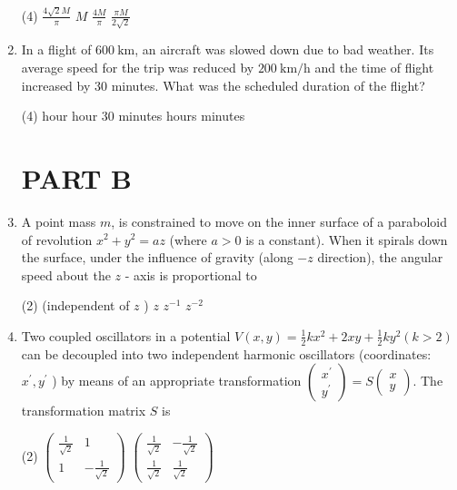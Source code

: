 \begin{enumerate}
 \begin{tasks}(4)
	\task[\textbf{a.}]$\frac{4 \sqrt{2} M}{\pi}$
	\task[\textbf{b.}]$M$
	\task[\textbf{c.}] $\frac{4 M}{\pi}$
	\task[\textbf{d.}] $\frac{\pi M}{2 \sqrt{2}}$
\end{tasks}
\item  In a flight of $600 \mathrm{~km}$, an aircraft was slowed down due to bad weather. Its average speed for the trip was reduced by $200 \mathrm{~km} / \mathrm{h}$ and the time of flight increased by 30 minutes. What was the scheduled duration of the flight?
 \begin{tasks}(4)
	 hour
	 hour 30 minutes
	 hours
	 minutes
\end{tasks}	
\section{PART B}	
\item  A point mass $m$, is constrained to move on the inner surface of a paraboloid of revolution $x^{2}+y^{2}=a z$ (where $a>0$ is a constant). When it spirals down the surface, under the influence of gravity (along $-z$ direction), the angular speed about the $z$ - axis is proportional to
 \begin{tasks}(2)
	 (independent of $z$ )
	\task[\textbf{b.}] $z$
	\task[\textbf{c.}]$z^{-1}$
	\task[\textbf{d.}] $z^{-2}$
\end{tasks}
\item  Two coupled oscillators in a potential $V(x, y)=\frac{1}{2} k x^{2}+2 x y+\frac{1}{2} k y^{2}(k>2)$ can be decoupled into two independent harmonic oscillators (coordinates: $x^{\prime}, y^{\prime}$ ) by means of an appropriate transformation $\left(\begin{array}{l}x^{\prime} \\ y^{\prime}\end{array}\right)=S\left(\begin{array}{l}x \\ y\end{array}\right)$. The transformation matrix $S$ is
 \begin{tasks}(2)
	\task[\textbf{a.}]$\left(\begin{array}{cc}\frac{1}{\sqrt{2}} & 1 \\ 1 & -\frac{1}{\sqrt{2}}\end{array}\right)$
	\task[\textbf{b.}]$\left(\begin{array}{cc}\frac{1}{\sqrt{2}} & -\frac{1}{\sqrt{2}} \\ \frac{1}{\sqrt{2}} & \frac{1}{\sqrt{2}}\end{array}\right)$

\end{tasks}
\end{enumerate}

